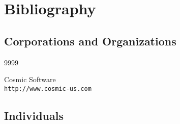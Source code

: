 
%
\chapter*{Bibliography}



\nocite{*}

%
%
%
%
%
%

\section*{Corporations and Organizations}

\begin{thecustombibliography}{9999}

Cosmic Software\\
\texttt{http://www.cosmic-us.com}

\end{thecustombibliography}


\section*{Individuals}

